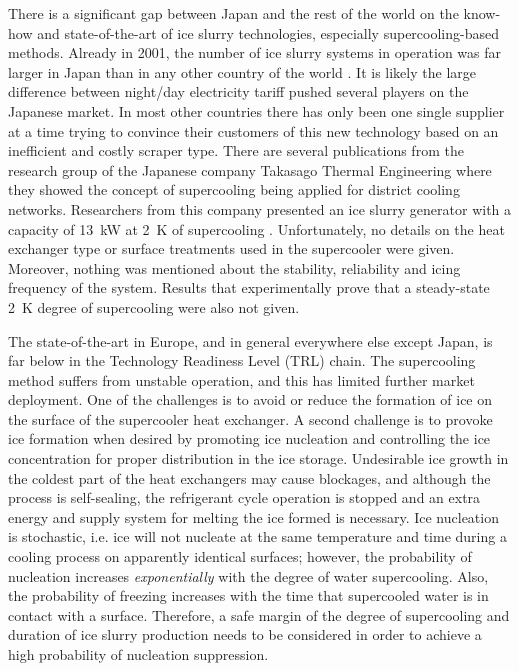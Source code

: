 There is a significant gap between Japan and the rest of the world on the know-how and state-of-the-art of ice slurry technologies, especially supercooling-based methods. Already in 2001, the number of ice slurry systems in operation was far larger in Japan than in any other country of the world \citep{kauffeld_ice_2019}. It is likely the large difference between night/day electricity tariff pushed several players on the Japanese market. In most other countries there has only been one single supplier at a time trying to convince their customers of this new technology based on an inefficient and costly scraper type. 
There are several publications from the research group of the Japanese company Takasago Thermal Engineering where they showed the concept of supercooling being applied for district cooling networks.
Researchers from this company presented an ice slurry generator with a capacity of 13~kW at 2~K of supercooling  \citep{tanino_ice-water_2001,kozawa_study_2005}. Unfortunately, no details on the heat exchanger type or surface treatments used in the supercooler were given. Moreover, nothing was mentioned about the stability, reliability and icing frequency of the system. Results that experimentally prove that a steady-state 2~K degree of supercooling were also not given. 


The state-of-the-art in Europe, and in general everywhere else except Japan, is far below in the Technology Readiness Level (TRL) chain. 
The supercooling method suffers from unstable operation, and this has limited further market deployment. 
One of the challenges is to avoid or reduce the formation of ice on the surface of the supercooler heat exchanger. 
A second challenge is to provoke ice formation when desired by promoting ice nucleation \citep{beaupere_nucleation_2018} and controlling the ice concentration for proper distribution in the ice storage.
Undesirable ice growth in the coldest part of the heat exchangers may cause blockages, and although the process is self-sealing, the refrigerant cycle operation is stopped and an extra energy and supply system for melting the ice formed is necessary. 
Ice nucleation is stochastic, i.e. ice will not nucleate at the same temperature and time during a cooling process on apparently identical surfaces; however, the probability of nucleation increases {\em exponentially} with the degree of water supercooling. Also, the probability of freezing increases with the time that supercooled water is in contact with a surface. 
Therefore, a safe margin of the degree of supercooling and duration of ice slurry production needs to be considered in order to achieve a high probability of nucleation suppression.

